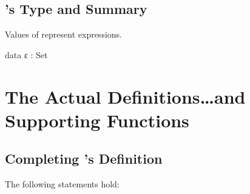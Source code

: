 \documentclass{report}
\begin{document}
\subsection{'s Type and Summary}
Values of  represent expressions.

\begin{code}
  data ε : Set
\end{code}

\section{The Actual Definitions\ldots and Supporting Functions}

\subsection{Completing 's Definition}
The following statements hold:
\end{document}
